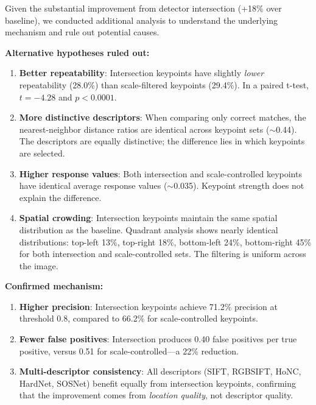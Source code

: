 Given the substantial improvement from detector intersection (+18\% over baseline), we conducted additional analysis to understand the underlying mechanism and rule out potential causes.

\textbf{Alternative hypotheses ruled out:}
\begin{enumerate}
    \item \textbf{Better repeatability}: Intersection keypoints have slightly \textit{lower} repeatability (28.0\%) than scale-filtered keypoints (29.4\%). In a paired t-test, $t=-4.28$ and $p<0.0001$.

    \item \textbf{More distinctive descriptors}: When comparing only correct matches, the nearest-neighbor distance ratios are identical across keypoint sets ($\sim$0.44). The descriptors are equally distinctive; the difference lies in which keypoints are selected.

    \item \textbf{Higher response values}: Both intersection and scale-controlled keypoints have identical average response values ($\sim$0.035). Keypoint strength does not explain the difference.

    \item \textbf{Spatial crowding}: Intersection keypoints maintain the same spatial distribution as the baseline. Quadrant analysis shows nearly identical distributions: top-left 13\%, top-right 18\%, bottom-left 24\%, bottom-right 45\% for both intersection and scale-controlled sets. The filtering is uniform across the image.
\end{enumerate}

\textbf{Confirmed mechanism:}
\begin{enumerate}
    \item \textbf{Higher precision}: Intersection keypoints achieve 71.2\% precision at threshold 0.8, compared to 66.2\% for scale-controlled keypoints.

    \item \textbf{Fewer false positives}: Intersection produces 0.40 false positives per true positive, versus 0.51 for scale-controlled---a 22\% reduction.

    \item \textbf{Multi-descriptor consistency}: All descriptors (SIFT, RGBSIFT, HoNC, HardNet, SOSNet) benefit equally from intersection keypoints, confirming that the improvement comes from \textit{location quality}, not descriptor quality.
\end{enumerate}


